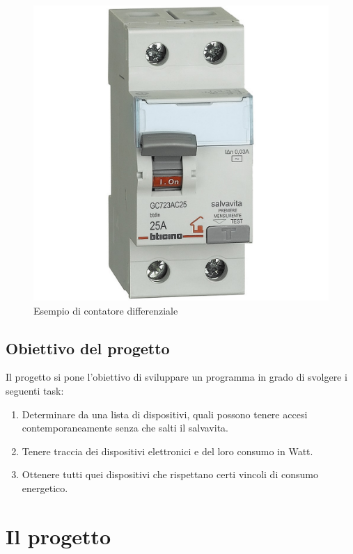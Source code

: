 \documentclass[12pt, letterpaper]{article}
\begin{document}
\begin{figure}
      \centering
      \includegraphics[scale=0.2]{interruttore-diff.jpg}
      \caption{Esempio di contatore differenziale}
\end{figure}


\subsection{Obiettivo del progetto}

Il progetto si pone l'obiettivo di sviluppare un programma in grado di svolgere
i seguenti task:

\begin{enumerate}
      \item Determinare da una lista di dispositivi, quali possono tenere accesi contemporaneamente
            senza che salti il salvavita.
      \item Tenere traccia dei dispositivi elettronici e del loro consumo in Watt.
      \item Ottenere tutti quei dispositivi che rispettano certi vincoli di consumo energetico.
\end{enumerate}

\section{Il progetto}
\end{document}
